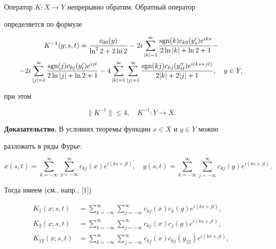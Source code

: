 \begin{thm} 


Оператор $K:X\to Y$ непрерывно обратим. Обратный оператор  


определяется по формуле 


\begin{multline} 


K^{-1}(y;s,t)=\frac{c_{00}(y)}{\ln^22+2\ln2}-2i\sum^\infty_{|k|=1} 


\frac{\sgn(k)c_{k0}(y'_s)e^{iks}}{2\ln|k|+\ln2+1}-\\ 


% 


-2i\sum^\infty_{|j|=1} 


\frac{\sgn(j)c_{0j}(y'_t)e^{ijt}}{2\ln|j|+\ln2+1}-4 


\sum^\infty_{|k|=1}\sum^\infty_{|j|=1} 


\frac{\sgn(kj)c_{kj}(y''_{st})e^{i(ks+jt)}}{2|k|+2|j|+1}, 


\quad y\in Y, 


\end{multline} 


при этом 


$$ 


\|K^{-1}\|\le4,\quad K^{-1}:Y\to X. 


$$ 


\end{thm} 


 


 


{\bf Доказательство.} В условиях теоремы функции $x\in X$ и $y\in Y$ можно  


разложить в ряды Фурье: 


$$ 


x(s,t)=\sum^\infty_{k=-\infty}\sum^\infty_{y=-\infty} 


c_{kj}(x)e^{i(ks+jt)},\quad 


y(s,t)=\sum^\infty_{k=-\infty}\sum^\infty_{j=-\infty} 


c_{kj}(y)e^{i(ks+jt)}. 


$$ 


Тогда имеем (см., напр., [1]) 


\begin{align} 


K_1(x;s,t)&=\sum^\infty_{k=-\infty}\sum^\infty_{j=-\infty} 


c_{kj}(x)c_k(g)e^{i(ks+jt)},\\ 


% 


K_2(x;s,t)&=\sum^\infty_{k=-\infty}\sum^\infty_{j=-\infty} 


c_{kj}(x)c_j(g)e^{i(ks+jt)},\\ 


%


K_{12}(x;s,t)&=\sum^\infty_{k=-\infty}\sum^\infty_{j=-\infty} 


c_{kj}(x)c_{kj}(g_{12})e^{i(ks+jt)},\end{align} 


